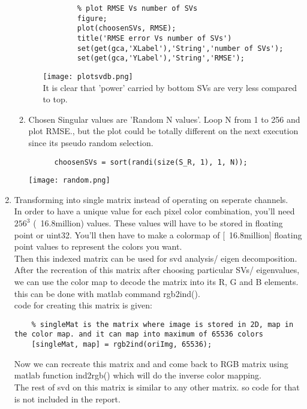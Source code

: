 \documentclass{article}
\begin{document}
\begin{enumerate}
\begin{enumerate}
\begin{enumerate}
\begin{lstlisting}
        % plot RMSE Vs number of SVs
        figure;
        plot(choosenSVs, RMSE);
        title('RMSE error Vs number of SVs')
        set(get(gca,'XLabel'),'String','number of SVs');
        set(get(gca,'YLabel'),'String','RMSE');
      \end{lstlisting}
      \texttt{[image: plotsvdb.png]}\\
      It is clear that 'power' carried by bottom SVs are very less compared to top.
    \end{enumerate}
    \newpage
    \item Chosen Singular values are 'Random N values'.
    Loop N from 1 to 256 and plot RMSE., but the plot could be totally different on the next execution since its pseudo random selection.\\
    \begin{lstlisting}
      choosenSVs = sort(randi(size(S_R, 1), 1, N));
    \end{lstlisting}
    \texttt{[image: random.png]}
  \end{enumerate}
  \item Transforming into single matrix instead of operating on seperate channels.\\
  In order to have a unique value for each pixel color combination, you'll need $256^3$ (~16.8million) values. These values will have to be stored in floating point or uint32. You'll then have to make a colormap of [~16.8million] floating point values to represent the colors you want. \\
  Then this indexed matrix can be used for svd analysis/ eigen decomposition. After the recreation of this matrix after choosing particular SVs/ eigenvalues, we can use the color map to decode the matrix into its R, G and B elements. this can be done with matlab command rgb2ind().\\
  code for creating this matrix is given:\\
  \begin{lstlisting}
    % singleMat is the matrix where image is stored in 2D, map in the color map. and it can map into maximum of 65536 colors
    [singleMat, map] = rgb2ind(oriImg, 65536);
  \end{lstlisting}

  Now we can recreate this matrix and and come back to RGB matrix using matlab function ind2rgb() which will do the inverse color mapping.\\
  The rest of svd on this matrix is similar to any other matrix. so code for that is not included in the report.

  
\end{enumerate}
\end{document}
